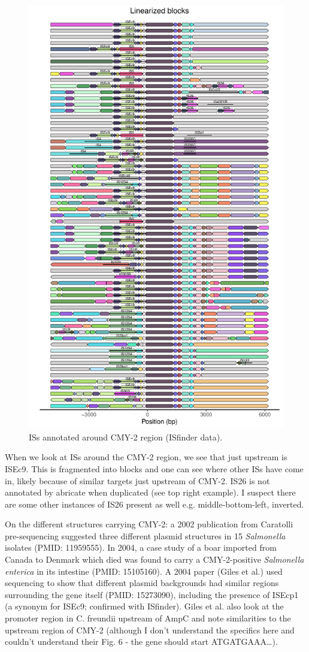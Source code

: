 \documentclass[aps,rmp,preprint,superscriptaddress,10pt,twocolumn]{revtex4-1}
\begin{document}
\begin{figure}
    \centering
    \includegraphics[width=0.8\linewidth]{figs/CMY-IS-hits.pdf}
    \caption{ISs annotated around CMY-2 region (ISfinder data).}
    \label{fig:CMY-2-IS-hits}
\end{figure}

When we look at ISs around the CMY-2 region, we see that just upstream is ISEc9. This is fragmented into blocks and one can see where other ISs have come in, likely because of similar targets just upstream of CMY-2. IS26 is not annotated by abricate when duplicated (see top right example). I suspect there are some other instances of IS26 present as well e.g. middle-bottom-left, inverted. 

On the different structures carrying CMY-2: a 2002 publication from Caratolli pre-sequencing suggested three different plasmid structures in 15 \textit{Salmonella} isolates (PMID: 11959555). In 2004, a case study of a boar imported from Canada to Denmark which died was found to carry a CMY-2-positive \textit{Salmonella enterica} in its intestine (PMID: 15105160). A 2004 paper (Giles et al.) used sequencing to show that different plasmid backgrounds had similar regions surrounding the gene itself (PMID: 15273090), including the presence of ISEcp1 (a synonym for ISEc9; confirmed with ISfinder). Giles et al. also look at the promoter region in C. freundii upstream of AmpC and note similarities to the upstream region of CMY-2 (although I don't understand the specifics here and couldn't understand their Fig. 6 - the gene should start ATGATGAAA\ldots).  
\end{document}
